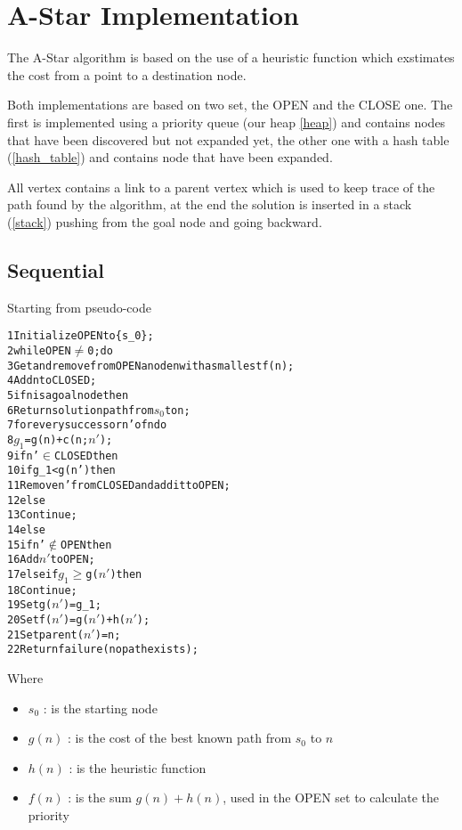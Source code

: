 \section{A-Star Implementation}
\label{Sec:implementation}

The A-Star algorithm is based on the use of a heuristic function which exstimates the cost from a point to a destination node.

Both implementations are based on two set, the OPEN and the CLOSE one. The first is implemented using a priority queue (our heap \ref{heap}) and contains nodes that have been discovered but not expanded yet, the other one with a hash table (\ref{hash_table}) and contains node that have been expanded.

All vertex contains a link to a parent vertex which is used to keep trace of the path found by the algorithm, at the end the solution is inserted in a stack (\ref{stack}) pushing from the goal node and going backward.

\subsection{Sequential}

Starting from pseudo-code \cite{bibParAstar}

\begin{alltt}
    1 Initialize OPEN to \{s_0\};
    2 while OPEN \(\neq\) 0; do
    3 Get and remove from OPEN a node n with a smallest f(n);
    4 Add n to CLOSED;
    5 if n is a goal node then
    6   Return solution path from \(s_0\) to n;
    7 for every successor n' of n do
    8   $g_1$ = g(n) + c(n; \(n'\));
    9   if n' \(\in\) CLOSED then
    10      if g_1 < g(n') then
    11          Remove n' from CLOSED and add it to OPEN;
    12      else
    13          Continue;
    14  else
    15      if n' \(\notin\) OPEN then
    16          Add $n'$ to OPEN;
    17      else if $g_1$ \(\geq\) g($n'$) then
    18          Continue;
    19  Set g($n'$) = g_1;
    20  Set f($n'$) = g($n'$) + h($n'$);
    21  Set parent($n'$) = n;
    22 Return failure (no path exists);
\end{alltt}

Where
\begin{itemize}
    \item $s_0$ : is the starting node
    \item $g(n)$ : is the cost of the best known path from $s_0$ to $n$
    \item $h(n)$ : is the heuristic function
    \item $f(n)$ : is the sum $g(n) + h(n)$, used in the OPEN set to calculate the priority
\end{itemize}

